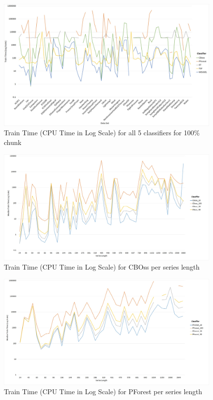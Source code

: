   \begin{figure} [!htb]
    \centering
    \includegraphics[width=\textwidth]{./Chapters/06 Results/Duration_100pct.jpg}
    \caption{Train Time (CPU Time in Log Scale) for all 5 classifiers for 100\% chunk}
    \label{fig:Duration100Line}
  \end{figure}
  \begin{figure} [!htb]
    \centering
    \includegraphics[width=\textwidth]{./Chapters/06 Results/Duration_cboss_length.jpg}
    \caption{Train Time (CPU Time in Log Scale) for CBOss per series length}
  \end{figure}
  
  \begin{figure} [!htb]
    \centering
    \includegraphics[width=\textwidth]{./Chapters/06 Results/Duration_pforest_length.jpg}
    \caption{Train Time (CPU Time in Log Scale) for PForest per series length}
  \end{figure}
  
